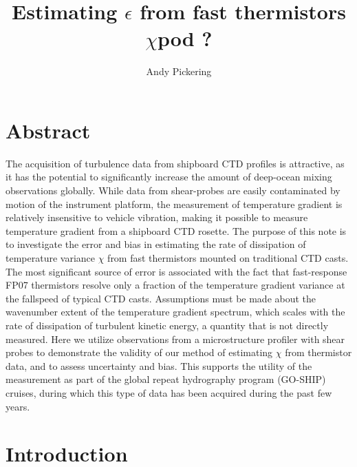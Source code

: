 \documentclass[11pt]{article}
\title{Estimating $\epsilon$ from fast thermistors $\chi$pod ?}
\author{Andy Pickering}
\begin{document}
\maketitle

\tableofcontents
\newpage



\section{Abstract}

The acquisition of turbulence data from shipboard CTD profiles is attractive, as it has the potential to significantly increase the amount of deep-ocean mixing observations globally.  While data from shear-probes are easily contaminated by motion of the instrument platform, the measurement of temperature gradient is relatively insensitive to vehicle vibration, making it possible to measure temperature gradient from a shipboard CTD rosette.  The purpose of this note is to investigate the error and bias in estimating the rate of dissipation of temperature variance $\chi$ from fast thermistors mounted on traditional CTD casts.  The most significant source of error is associated with the fact that fast-response FP07 thermistors resolve only a fraction of the temperature gradient variance at the fallspeed of typical CTD casts.  Assumptions must be made about the wavenumber extent of the temperature gradient spectrum, which scales with the rate of dissipation of turbulent kinetic energy, a quantity that is not directly measured.  Here we utilize observations from a microstructure profiler with shear probes to demonstrate the validity of our method of estimating $\chi$ from thermistor data, and to assess uncertainty and bias. This supports the utility of the measurement as part of the global repeat hydrography program (GO-SHIP) cruises, during which this type of data has been acquired during the past few years.



\section{Introduction}
\end{document}
